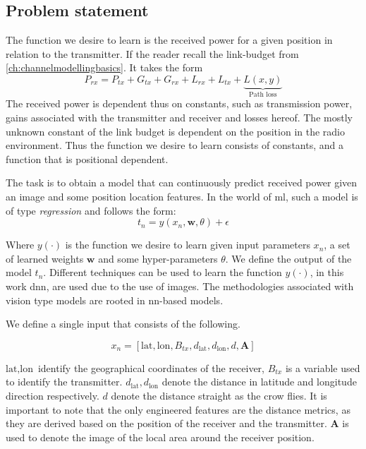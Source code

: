 \subsection{Problem statement}

The function we desire to learn is the received power for a given position in relation to the transmitter. If the reader recall the link-budget from \ref{ch:channelmodellingbasics}. It takes the form
\begin{equation}
    P_{rx} = P_{tx} + G_{tx} + G_{rx} + L_{rx} + L_{tx} + \underbrace{L(x,y)}_{\text{Path loss}}
\end{equation}
The received power is dependent thus on constants, such as transmission power, gains associated with the transmitter and receiver and losses hereof. The mostly unknown constant of the link budget is dependent on the position in the radio environment. Thus the function we desire to learn consists of constants, and a function that is positional dependent.  

The task is to obtain a model that can continuously predict received power given an image and some position location features. In the world of \gls{ml}, such a model is of type \emph{regression} and follows the form:
\begin{equation}\label{eq:dl_model_satellite}
    t_n = y(x_n, \mathbf{w}, \theta) + \epsilon
\end{equation}

Where $y(\cdot)$ is the function we desire to learn given input parameters $x_n$, a set of learned weights $\mathbf{w}$ and some hyper-parameters $\theta$. We define the output of the model $t_n$. Different techniques can be used to learn the function $y(\cdot)$, in this work \gls{dnn}, are used due to the use of images. The methodologies associated with vision type models are rooted in \gls{nn}-based models.



We define a single input that consists of the following.

\begin{equation}\label{eq:dnn_inputs}
    x_n = [\text{lat}, \text{lon}, B_{tx}, d_{\text{lat}}, d_{\text{lon}}, d, \mathbf{A}]
\end{equation}

$\text{lat}, \text{lon}$ identify the geographical coordinates of the receiver, $B_{tx}$ is a variable used to identify the transmitter. $ d_{\text{lat}}, d_{\text{lon}} $ denote the distance in latitude and longitude direction respectively. $d$ denote the distance straight as the crow flies. It is important to note that the only engineered features are the distance metrics, as they are derived based on the position of the receiver and the transmitter. $\mathbf{A}$ is used to denote the image of the local area around the receiver position. 

